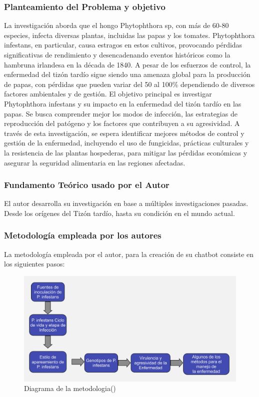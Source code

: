\subsubsection{Planteamiento del Problema y objetivo }

La investigación aborda que el hongo Phytophthora sp, con más de 60-80 especies, infecta diversas plantas, incluidas las papas y los tomates. Phytophthora infestans, en particular, causa estragos en estos cultivos, provocando pérdidas significativas de rendimiento y desencadenando eventos históricos como la hambruna irlandesa en la década de 1840. A pesar de los esfuerzos de control, la enfermedad del tizón tardío sigue siendo una amenaza global para la producción de papas, con pérdidas que pueden variar del 50 al 100\% dependiendo de diversos factores ambientales y de gestión. El objetivo principal es investigar Phytophthora infestans y su impacto en la enfermedad del tizón tardío en las papas. Se busca comprender mejor los modos de infección, las estrategias de reproducción del patógeno y los factores que contribuyen a su agresividad. A través de esta investigación, se espera identificar mejores métodos de control y gestión de la enfermedad, incluyendo el uso de fungicidas, prácticas culturales y la resistencia de las plantas hospederas, para mitigar las pérdidas económicas y asegurar la seguridad alimentaria en las regiones afectadas.

\subsubsection{Fundamento Teórico usado por el Autor}

El autor desarrolla su investigación en base a múltiples investigaciones pasadas. Desde los orígenes del Tizón tardío, hasta su condición en el mundo actual.

\subsubsection{Metodología empleada por los autores}
La metodología empleada por el autor, para la creación de su chatbot consiste en los siguientes pasos: 


\begin{figure}[H]
	\begin{center}
		\includegraphics[width=1\textwidth]{2/figures/ant4.jpg}
		\caption{Diagrama de la metodologia(\cite{antecedente4})}
	\end{center}
\end{figure}

